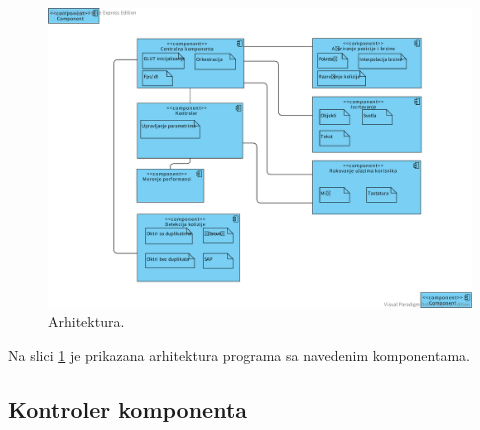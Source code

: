 \documentclass[12pt,oneside]{memoir}
\begin{document}
\begin{figure}[h!]
	\centerfloat
	\includegraphics[trim=150 50 100 50,clip,scale=0.6]{architecture.pdf}
	\caption{Arhitektura.}
	\label{fig:archi}
\end{figure}

Na slici \ref{fig:archi} je prikazana arhitektura programa sa navedenim komponentama.

\subsection{Kontroler komponenta}
\end{document}
